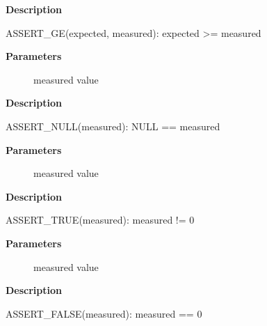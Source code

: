 \documentclass[a4paper,8pt,english]{sphinxmanual}
\begin{document}
\textbf{Description}

ASSERT\_GE(expected, measured): expected \textgreater{}= measured

\begin{fulllineitems}
\label{dev-tools/kselftest:c.ASSERT_NULL}
\end{fulllineitems}


\textbf{Parameters}
\begin{description}
\item[{}] \leavevmode
measured value

\end{description}

\textbf{Description}

ASSERT\_NULL(measured): NULL == measured

\begin{fulllineitems}
\label{dev-tools/kselftest:c.ASSERT_TRUE}
\end{fulllineitems}


\textbf{Parameters}
\begin{description}
\item[{}] \leavevmode
measured value

\end{description}

\textbf{Description}

ASSERT\_TRUE(measured): measured != 0

\begin{fulllineitems}
\label{dev-tools/kselftest:c.ASSERT_FALSE}
\end{fulllineitems}


\textbf{Parameters}
\begin{description}
\item[{}] \leavevmode
measured value

\end{description}

\textbf{Description}

ASSERT\_FALSE(measured): measured == 0

\begin{fulllineitems}
\label{dev-tools/kselftest:c.ASSERT_STREQ}
\end{fulllineitems}
\end{document}
